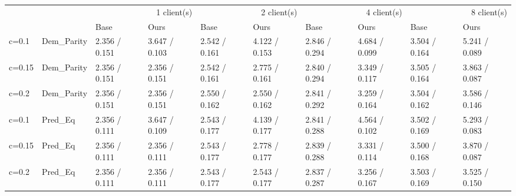 \begin{tabular}{llllllllll}
\toprule
 &  & \multicolumn{2}{r}{1 client(s)} & \multicolumn{2}{r}{2 client(s)} & \multicolumn{2}{r}{4 client(s)} & \multicolumn{2}{r}{8 client(s)} \\
 &  & Base & Ours & Base & Ours & Base & Ours & Base & Ours \\
\midrule
c=0.1 & Dem_Parity & 2.356 / 0.151 & 3.647 / 0.103 & 2.542 / 0.161 & 4.122 / 0.153 & 2.846 / 0.294 & 4.684 / 0.099 & 3.504 / 0.164 & 5.241 / 0.089 \\
\cline{1-10}
c=0.15 & Dem_Parity & 2.356 / 0.151 & 2.356 / 0.151 & 2.542 / 0.161 & 2.775 / 0.161 & 2.840 / 0.294 & 3.349 / 0.117 & 3.505 / 0.164 & 3.863 / 0.087 \\
\cline{1-10}
c=0.2 & Dem_Parity & 2.356 / 0.151 & 2.356 / 0.151 & 2.550 / 0.162 & 2.550 / 0.162 & 2.841 / 0.292 & 3.259 / 0.164 & 3.504 / 0.162 & 3.586 / 0.146 \\
\cline{1-10}
c=0.1 & Pred_Eq & 2.356 / 0.111 & 3.647 / 0.109 & 2.543 / 0.177 & 4.139 / 0.177 & 2.841 / 0.288 & 4.564 / 0.102 & 3.502 / 0.169 & 5.293 / 0.083 \\
\cline{1-10}
c=0.15 & Pred_Eq & 2.356 / 0.111 & 2.356 / 0.111 & 2.543 / 0.177 & 2.778 / 0.177 & 2.839 / 0.288 & 3.331 / 0.114 & 3.500 / 0.168 & 3.870 / 0.087 \\
\cline{1-10}
c=0.2 & Pred_Eq & 2.356 / 0.111 & 2.356 / 0.111 & 2.543 / 0.177 & 2.543 / 0.177 & 2.837 / 0.287 & 3.256 / 0.167 & 3.503 / 0.169 & 3.525 / 0.150 \\
\cline{1-10}
\bottomrule
\end{tabular}
